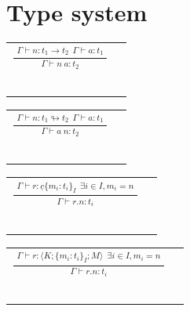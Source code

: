 \documentclass{article}[11pt]
\newcommand{\regle}[2]
{
    \frac{\begin{array}{l}
              #1
    \end{array}}
    {\begin{array}{l}
         #2
    \end{array}}
}
\newcommand{\reglenomme}[3]
{
    \noindent
    \begin{tabular}{ll}
        $\regle{#1}{#2}$
        & {\small {\sf #3}} \\
        ~ \\
    \end{tabular}
}
\begin{document}
    \section{Type system}\label{sec:type-system}

    \reglenomme
    {\Gamma \vdash n : t_1 \rightarrow t_2 ~~ \Gamma \vdash a : t_1}
    {\Gamma \vdash n~a : t_2}
    {}

    \reglenomme
    {\Gamma \vdash n : t_1 \looparrowright t_2 ~~ \Gamma \vdash a : t_1}
    {\Gamma \vdash a~n : t_2}
    {}

    \reglenomme
    {\Gamma \vdash r : \underline{c}\{ m_i:t_i \}_I ~~ \exists i \in I, m_i = n}
    {\Gamma \vdash r.n : t_i}
    {}

    \reglenomme
    {\Gamma \vdash r : \langle K; \{ m_i:t_i \}_I ; M \rangle ~~ \exists i \in I, m_i = n}
    {\Gamma \vdash r.n : t_i}
    {}
\end{document}
